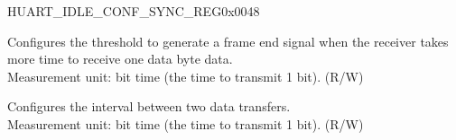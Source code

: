 \begin{register}{H}{UART\_IDLE\_CONF\_SYNC\_REG}{0x0048}\label{regdesc:UARTIDLECONFSYNCREG}
%
%
%
\regnewline%
\begin{regdesc}\begin{reglist}
\label{fielddesc:UARTRXIDLETHRHD}\item [UART\_RX\_IDLE\_THRHD] Configures the threshold to generate a frame end signal when the receiver takes more time to receive one data byte data.\\Measurement unit: bit time (the time to transmit 1 bit). (R/W)
\label{fielddesc:UARTTXIDLENUM}\item [UART\_TX\_IDLE\_NUM] Configures the interval between two data transfers.\\Measurement unit: bit time (the time to transmit 1 bit). (R/W)
\end{reglist}\end{regdesc}
\end{register}


